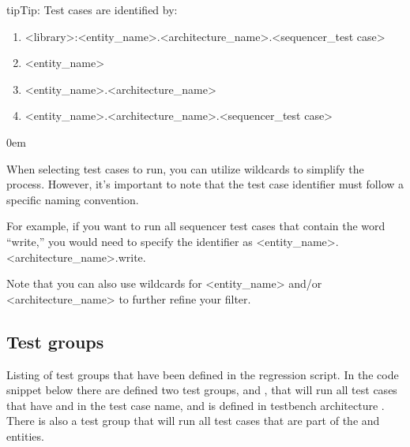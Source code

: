 \documentclass[letterpaper,10pt,english]{sphinxmanual}
\begin{document}
\begin{sphinxadmonition}{tip}{Tip:}
\sphinxAtStartPar
Test cases are identified by:
\begin{enumerate}
%
\item {} 
\sphinxAtStartPar
\textless{}library\textgreater{}:\textless{}entity\_name\textgreater{}.\textless{}architecture\_name\textgreater{}.\textless{}sequencer\_test case\textgreater{}

\item {} 
\sphinxAtStartPar
\textless{}entity\_name\textgreater{}

\item {} 
\sphinxAtStartPar
\textless{}entity\_name\textgreater{}.\textless{}architecture\_name\textgreater{}

\item {} 
\sphinxAtStartPar
\textless{}entity\_name\textgreater{}.\textless{}architecture\_name\textgreater{}.\textless{}sequencer\_test case\textgreater{}

\end{enumerate}

\begin{DUlineblock}{0em}
\item[] When selecting test cases to run, you can utilize wildcards to simplify the process. However, it’s important to
note that the test case identifier must follow a specific naming convention.
\item[] For example, if you want to run all sequencer test cases that contain the word “write,” you would need to specify
the identifier as \textless{}entity\_name\textgreater{}.\textless{}architecture\_name\textgreater{}.write.
\item[] Note that you can also use wildcards for \textless{}entity\_name\textgreater{} and/or \textless{}architecture\_name\textgreater{} to further
refine your filter.
\end{DUlineblock}
\end{sphinxadmonition}


\subsection{Test groups}
\label{\detokenize{cli:test-groups}}
\sphinxAtStartPar
Listing of test groups that have been defined in the regression script. In the code snippet below there are defined
two test groups,  and , that will run all test cases that have  and 
in the test case name, and is defined in testbench  architecture .
There is also a test group  that will run all test cases that are part of the  and
 entities.
\end{document}
